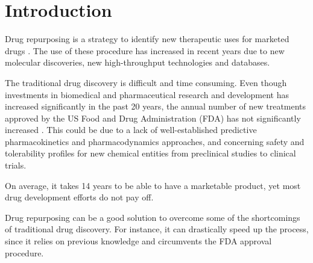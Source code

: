 \documentclass[fleqn,10pt]{SelfArx} %
\affiliation{\textsuperscript{1}\textit{Quantitative and Computational Biology Master, University of Trento, Italy}}
\affiliation{{\small$^{^\wedge}$}\textit{Equal contributions}}
\begin{document}
\flushbottom %

\maketitle %

\tableofcontents %

\thispagestyle{empty} %


\section*{Introduction} %


Drug repurposing is a strategy to identify new therapeutic uses for marketed drugs \cite{Polamreddy}. The use of these procedure has increased in recent years due to new molecular discoveries, new high-throughput technologies and databases. 

The traditional drug discovery is difficult and time consuming. Even though investments in biomedical and pharmaceutical research and development has increased significantly in the past 20 years, the annual number of new treatments approved by the US Food and Drug Administration (FDA) has not significantly increased \cite{Feixiong}. This could be due to a lack of well-established  predictive pharmacokinetics and pharmacodynamics approaches, and concerning safety and tolerability profiles for new chemical entities from preclinical studies to clinical trials\cite{Shih}. 

On average, it takes 14 years to be able to have a marketable product, yet most drug development efforts do not pay off.

Drug repurposing can be a good solution to overcome some of the shortcomings of traditional drug discovery. For instance, it can drastically speed up the process, since it relies on previous knowledge and circumvents the FDA approval procedure.
\end{document}
